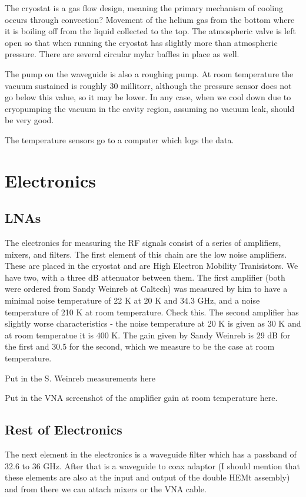 \documentclass[11pt]{article}
\begin{document}
The cryostat is a gas flow design, meaning the primary mechanism of cooling occurs through convection? Movement of the helium gas from the bottom where it is boiling off from the liquid collected to the top. The atmospheric valve is left open so that when running the cryostat has slightly more than atmospheric pressure. There are several circular mylar baffles in place as well.

The pump on the waveguide is also a roughing pump. At room temperature the vacuum sustained is roughly 30 millitorr, although the pressure sensor does not go below this value, so it may be lower. In any case, when we cool down due to cryopumping the vacuum in the cavity region, assuming no vacuum leak, should be very good.

The temperature sensors go to a computer which logs the data.

\section{Electronics}
\subsection{LNAs}
The electronics for measuring the RF signals consist of a series of amplifiers, mixers, and filters. The first element of this chain are the low noise amplifiers. These are placed in the cryostat and are High Electron Mobility Tranisistors. We have two, with a three dB attenuator between them. The first amplifier (both were ordered from Sandy Weinreb at Caltech) was measured by him to have a minimal noise temperature of 22 K at 20 K and 34.3 GHz, and a noise temperature of 210  K at room temperature. Check this. The second amplifier has slightly worse characteristics - the noise temperature at 20 K is given as 30 K and at room temperatue it is 400 K. The gain given by Sandy Weinreb is 29 dB for the first and 30.5 for the second, which we measure to be the case at room temperature.

Put in the S. Weinreb measurements here

Put in the VNA screenshot of the amplifier gain at room temperature here.

\subsection{Rest of Electronics}

The next element in the electronics is a waveguide filter which has a passband of 32.6 to 36 GHz. After that is a waveguide to coax adaptor (I should mention that these elements are also at the input and output of the double HEMt assembly) and from there we can attach mixers or the VNA cable.
\end{document}
